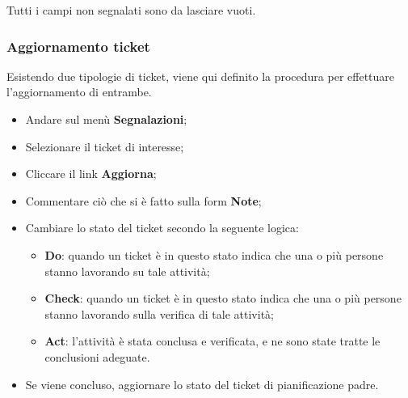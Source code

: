 Tutti i campi non segnalati sono da lasciare vuoti. 

\subsubsection{Aggiornamento ticket}

Esistendo due tipologie di ticket, viene qui definito la procedura per effettuare l’aggiornamento di entrambe.


\begin{itemize}
\item Andare sul menù \textbf{Segnalazioni}; 
\item Selezionare il ticket di interesse; 
\item Cliccare il link \textbf{Aggiorna}; 
\item Commentare ciò che si è fatto sulla form \textbf{Note}; 
\item Cambiare lo stato del ticket secondo la seguente logica:
		\begin{itemize}
		\item \textbf{Do}: quando un ticket è in questo stato indica che una o più persone stanno 
		lavorando su tale attività; 
		\item \textbf{Check}: quando un ticket è in questo stato indica che una o più persone 
		stanno lavorando sulla verifica di tale attività; 
		\item \textbf{Act}: l’attività è stata conclusa e verificata, e ne sono state tratte le conclusioni adeguate. 
		
		\end{itemize} 

\item Se viene concluso, aggiornare lo stato del ticket di pianificazione padre. 

\end{itemize}



